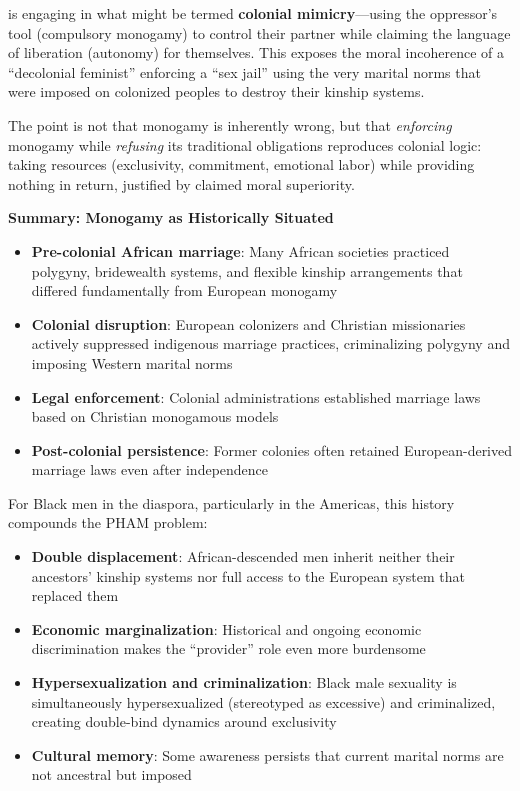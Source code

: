 \documentclass[12pt,openany]{book}
\numberwithin{equation}{chapter}
\begin{document}
\noindent is engaging in what might be termed \textbf{colonial mimicry}---using the oppressor's tool (compulsory monogamy) to control their partner while claiming the language of liberation (autonomy) for themselves. This exposes the moral incoherence of a ``decolonial feminist'' enforcing a ``sex jail'' using the very marital norms that were imposed on colonized peoples to destroy their kinship systems.

The point is not that monogamy is inherently wrong, but that \textit{enforcing} monogamy while \textit{refusing} its traditional obligations reproduces colonial logic: taking resources (exclusivity, commitment, emotional labor) while providing nothing in return, justified by claimed moral superiority.

\textbf{Summary: Monogamy as Historically Situated}

\begin{itemize}
    \item \textbf{Pre-colonial African marriage}: Many African societies practiced polygyny, bridewealth systems, and flexible kinship arrangements that differed fundamentally from European monogamy
    \item \textbf{Colonial disruption}: European colonizers and Christian missionaries actively suppressed indigenous marriage practices, criminalizing polygyny and imposing Western marital norms
    \item \textbf{Legal enforcement}: Colonial administrations established marriage laws based on Christian monogamous models
    \item \textbf{Post-colonial persistence}: Former colonies often retained European-derived marriage laws even after independence
\end{itemize}

For Black men in the diaspora, particularly in the Americas, this history compounds the PHAM problem:

\begin{itemize}
    \item \textbf{Double displacement}: African-descended men inherit neither their ancestors' kinship systems nor full access to the European system that replaced them
    \item \textbf{Economic marginalization}: Historical and ongoing economic discrimination makes the ``provider'' role even more burdensome
    \item \textbf{Hypersexualization and criminalization}: Black male sexuality is simultaneously hypersexualized (stereotyped as excessive) and criminalized, creating double-bind dynamics around exclusivity
    \item \textbf{Cultural memory}: Some awareness persists that current marital norms are not ancestral but imposed
\end{itemize}
\end{document}
